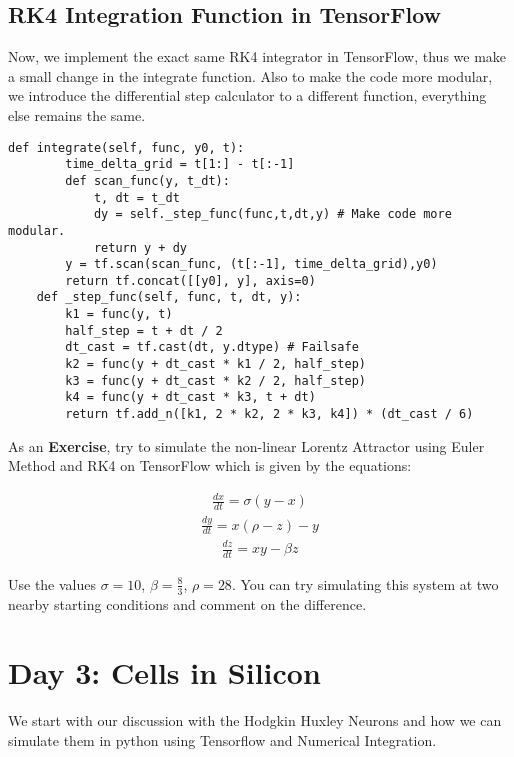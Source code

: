 \documentclass[10pt,letterpaper]{article}
\begin{document}
\subsection*{RK4 Integration Function in TensorFlow}

Now, we implement the exact same RK4 integrator in TensorFlow, thus we make a small change in the integrate function. Also to make the code more modular, we introduce the differential step calculator to a different function, everything else remains the same.

\begin{verbatim}
def integrate(self, func, y0, t): 
        time_delta_grid = t[1:] - t[:-1]
        def scan_func(y, t_dt): 
            t, dt = t_dt
            dy = self._step_func(func,t,dt,y) # Make code more modular.
            return y + dy
        y = tf.scan(scan_func, (t[:-1], time_delta_grid),y0)
        return tf.concat([[y0], y], axis=0)
    def _step_func(self, func, t, dt, y):
        k1 = func(y, t)
        half_step = t + dt / 2
        dt_cast = tf.cast(dt, y.dtype) # Failsafe
        k2 = func(y + dt_cast * k1 / 2, half_step)
        k3 = func(y + dt_cast * k2 / 2, half_step)
        k4 = func(y + dt_cast * k3, t + dt)
        return tf.add_n([k1, 2 * k2, 2 * k3, k4]) * (dt_cast / 6)
\end{verbatim}

As an \textbf{Exercise}, try to simulate the non-linear Lorentz Attractor using Euler Method and RK4 on TensorFlow which is given by the equations:

\begin{eqnarray}\frac{dx}{dt}=\sigma(y-x) \end{eqnarray}
\begin{eqnarray}\frac{dy}{dt}=x(\rho-z)-y \end{eqnarray}
\begin{eqnarray}\frac{dz}{dt}=xy-\beta z \end{eqnarray}

Use the values $\sigma =10$, $\beta =\frac{8}{3}$, $\rho =28$. You can try simulating this system at two nearby starting conditions and comment on the difference.

\section*{Day 3: Cells in Silicon}

We start with our discussion with the Hodgkin Huxley Neurons and how we can simulate them in python using Tensorflow and Numerical Integration.
\end{document}
